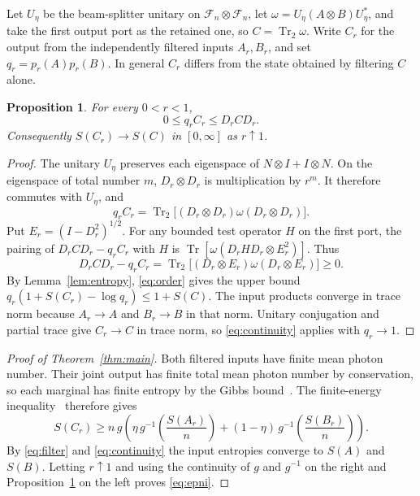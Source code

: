 \documentclass[11pt,letterpaper]{article}
\newtheorem{proposition}[theorem]{Proposition}
\numberwithin{equation}{section}
\DeclareMathOperator{\Tr}{Tr}
\newcommand{\Fock}{\mathcal F_n}
\begin{document}
Let $U_\eta$ be the beam-splitter unitary on $\Fock\otimes\Fock$, let
$\omega=U_\eta(A\otimes B)U_\eta^*$, and take the first output port
as the retained one, so $C=\Tr_2\omega$. Write $C_r$ for the output
from the independently filtered inputs $A_r,B_r$, and set
$q_r=p_r(A)p_r(B)$. In general $C_r$ differs from the state obtained
by filtering $C$ alone.

\begin{proposition}\label{prop:output}
For every $0<r<1$,
\begin{equation}\label{eq:order}
 0\le q_r C_r\le D_r C D_r.
\end{equation}
Consequently $S(C_r)\to S(C)$ in $[0,\infty]$ as $r\uparrow1$.
\end{proposition}

\begin{proof}
The unitary $U_\eta$ preserves each eigenspace of
$N\otimes I+I\otimes N$. On the eigenspace of total number $m$,
$D_r\otimes D_r$ is multiplication by $r^m$. It therefore commutes
with $U_\eta$, and
\[
 q_r C_r=\Tr_2\bigl[(D_r\otimes D_r)\omega(D_r\otimes D_r)\bigr].
\]
Put $E_r=(I-D_r^2)^{1/2}$. For any bounded test operator $H$ on the
first port, the pairing of $D_r C D_r-q_r C_r$ with $H$ is
$\Tr[\omega(D_r H D_r\otimes E_r^2)]$. Thus
\[
 D_r C D_r-q_r C_r
 =\Tr_2\bigl[(D_r\otimes E_r)\omega(D_r\otimes E_r)\bigr]\ge0.
\]
By Lemma~\ref{lem:entropy}, \eqref{eq:order} gives the upper bound
$q_r(1+S(C_r)-\log q_r)\le1+S(C)$. The input products converge in
trace norm because $A_r\to A$ and $B_r\to B$ in that norm. Unitary
conjugation and partial trace give $C_r\to C$ in trace norm, so
\eqref{eq:continuity} applies with $q_r\to1$.
\end{proof}

\begin{proof}[Proof of Theorem~\ref{thm:main}]
Both filtered inputs have finite mean photon number. Their joint
output has finite total mean photon number by conservation, so each
marginal has finite entropy by the Gibbs bound~\cite[Lemma~2.2]{oai}.
The finite-energy inequality~\cite[Theorem~1.1]{oai} therefore gives
\begin{equation}\label{eq:regularized}
 S(C_r)\ge n\,g\!\left(
 \eta\,g^{-1}\!\left(\frac{S(A_r)}{n}\right)
 +(1-\eta)\,g^{-1}\!\left(\frac{S(B_r)}{n}\right)\right).
\end{equation}
By \eqref{eq:filter} and \eqref{eq:continuity} the input entropies
converge to $S(A)$ and $S(B)$. Letting $r\uparrow1$ and using the
continuity of $g$ and $g^{-1}$ on the right and
Proposition~\ref{prop:output} on the left proves \eqref{eq:epni}.
\end{proof}
\end{document}
